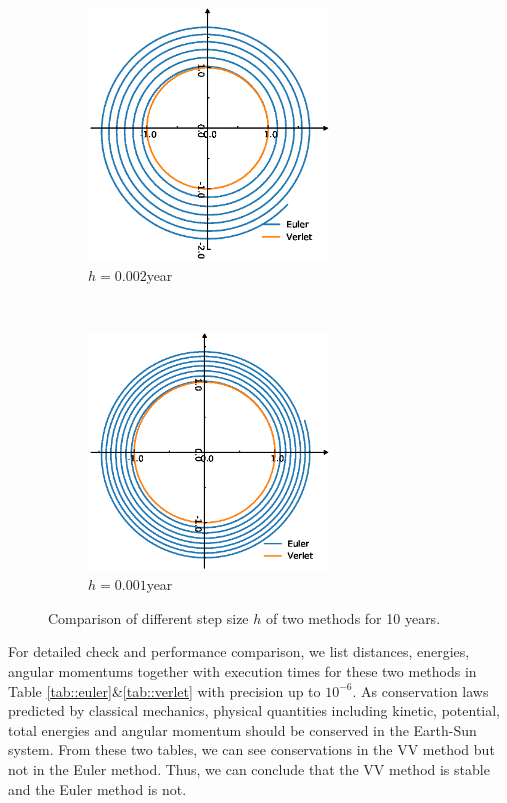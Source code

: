 \begin{figure}[tb]
\begin{subfigure}[tb]{0.5\textwidth}
		\includegraphics[width=0.7\textwidth]{Earth5000.eps}		\caption{$h = 0.002$year}
		\label{fig:earth5000}
	\end{subfigure}
~
	\begin{subfigure}[tb]{0.5\textwidth}
		\centering
		\includegraphics[width=0.7\textwidth]{Earth10000.eps}		\caption{$h = 0.001$year}
		\label{fig:earth10000}
	\end{subfigure}
	\caption{Comparison of different step size $h$ of two methods for 10 years. }
	\label{fig::earth}
\end{figure}

 For detailed check and performance comparison, we list distances, energies, angular momentums together with execution times for these two methods in Table \ref{tab::euler}\&\ref{tab::verlet} with precision up to $10^{-6}$.
 As conservation laws predicted by classical mechanics, physical quantities including kinetic, potential, total energies and angular momentum should be conserved in the Earth-Sun system. 
 From these two tables, we can see conservations in the VV method but not in the Euler method. 
 Thus, we can conclude that the VV method is stable and the Euler method is not.
 

